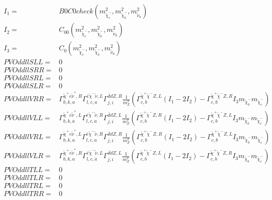 \documentclass[A4,landscape]{article}
\begin{document}
\begin{align} 
I_1= & B0C0check(m^2_{\tilde{\chi}^-_{{c}}}, m^2_{\tilde{\chi}^-_{{b}}}, m^2_{\tilde{\nu}_{{a}}}) \\ 
I_2= & C_{00}(m^2_{\tilde{\chi}^-_{{c}}}, m^2_{\tilde{\chi}^-_{{b}}}, m^2_{\tilde{\nu}_{{a}}}) \\ 
I_3= & C_0(m^2_{\tilde{\chi}^-_{{c}}}, m^2_{\tilde{\chi}^-_{{b}}}, m^2_{\tilde{\nu}_{{a}}}) \\ 
  PVOddllSLL= & 0 \\ 
  PVOddllSRR= & 0 \\ 
  PVOddllSRL= & 0 \\ 
  PVOddllSLR= & 0 \\ 
  PVOddllVRR= &  \Gamma^{\tilde{\chi}^+e \tilde{\nu}^*,R}_{b, k, a} \Gamma^{\bar{e}\tilde{\chi}^- \tilde{\nu} ,L}_{l, c, a} \Gamma^{\bar{d}d Z ,R}_{j, i} \frac{1}{m^2_{Z}} (\Gamma^{\tilde{\chi}^+\tilde{\chi}^- Z ,L}_{c, b} (I_1 - 2 I_2) - \Gamma^{\tilde{\chi}^+\tilde{\chi}^- Z ,R}_{c, b} I_3 m_{\tilde{\chi}^-_{{b}}} m_{\tilde{\chi}^-_{{c}}}) \\ 
  PVOddllVLL= &  \Gamma^{\tilde{\chi}^+e \tilde{\nu}^*,L}_{b, k, a} \Gamma^{\bar{e}\tilde{\chi}^- \tilde{\nu} ,R}_{l, c, a} \Gamma^{\bar{d}d Z ,L}_{j, i} \frac{1}{m^2_{Z}} (\Gamma^{\tilde{\chi}^+\tilde{\chi}^- Z ,R}_{c, b} (I_1 - 2 I_2) - \Gamma^{\tilde{\chi}^+\tilde{\chi}^- Z ,L}_{c, b} I_3 m_{\tilde{\chi}^-_{{b}}} m_{\tilde{\chi}^-_{{c}}}) \\ 
  PVOddllVRL= &  \Gamma^{\tilde{\chi}^+e \tilde{\nu}^*,L}_{b, k, a} \Gamma^{\bar{e}\tilde{\chi}^- \tilde{\nu} ,R}_{l, c, a} \Gamma^{\bar{d}d Z ,R}_{j, i} \frac{1}{m^2_{Z}} (\Gamma^{\tilde{\chi}^+\tilde{\chi}^- Z ,R}_{c, b} (I_1 - 2 I_2) - \Gamma^{\tilde{\chi}^+\tilde{\chi}^- Z ,L}_{c, b} I_3 m_{\tilde{\chi}^-_{{b}}} m_{\tilde{\chi}^-_{{c}}}) \\ 
  PVOddllVLR= &  \Gamma^{\tilde{\chi}^+e \tilde{\nu}^*,R}_{b, k, a} \Gamma^{\bar{e}\tilde{\chi}^- \tilde{\nu} ,L}_{l, c, a} \Gamma^{\bar{d}d Z ,L}_{j, i} \frac{1}{m^2_{Z}} (\Gamma^{\tilde{\chi}^+\tilde{\chi}^- Z ,L}_{c, b} (I_1 - 2 I_2) - \Gamma^{\tilde{\chi}^+\tilde{\chi}^- Z ,R}_{c, b} I_3 m_{\tilde{\chi}^-_{{b}}} m_{\tilde{\chi}^-_{{c}}}) \\ 
  PVOddllTLL= & 0 \\ 
  PVOddllTLR= & 0 \\ 
  PVOddllTRL= & 0 \\ 
  PVOddllTRR= & 0 \\ 
\end{align} 
\end{document}
